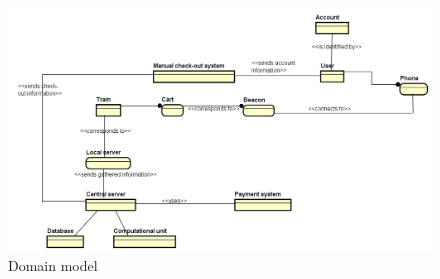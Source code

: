 \begin{figure}[H]
	\centering
	\includegraphics[width=\textwidth]{Pictures/domain_model.png}
	\caption{Domain model}
	\label{fig:domain_model}
\end{figure}